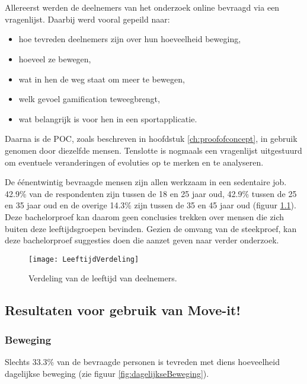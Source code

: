 \chapter{}%
\label{ch:analyse}

Allereerst werden de deelnemers van het onderzoek online bevraagd via een vragenlijst. Daarbij werd vooral gepeild naar:
\begin{itemize}
    \item hoe tevreden deelnemers zijn over hun hoeveelheid beweging,
    \item hoeveel ze bewegen,
    \item wat in hen de weg staat om meer te bewegen,
    \item welk gevoel gamification teweegbrengt,
    \item wat belangrijk is voor hen in een sportapplicatie.
\end{itemize}

Daarna is de POC, zoals beschreven in hoofdstuk \ref{ch:proofofconcept}, in gebruik genomen door diezelfde mensen. Tenslotte is nogmaals een vragenlijst uitgestuurd om eventuele veranderingen of evoluties op te merken en te analyseren.

De éénentwintig bevraagde mensen zijn allen werkzaam in een sedentaire job. 42.9\% van de respondenten zijn tussen de 18 en 25 jaar oud, 42.9\% tussen de 25 en 35 jaar oud en de overige 14.3\% zijn tussen de 35 en 45 jaar oud (figuur \ref{fig:leeftijd}). Deze bachelorproef kan daarom geen conclusies trekken over mensen die zich buiten deze leeftijdsgroepen bevinden. Gezien de omvang van de steekproef, kan deze bachelorproef  suggesties doen die aanzet geven naar verder onderzoek.

\begin{figure}
    \caption[Verdeling van de leeftijd van deelnemers]{Verdeling van de leeftijd van deelnemers.}
    \texttt{[image: LeeftijdVerdeling]}
    \label{fig:leeftijd}
\end{figure}

\section{Resultaten voor gebruik van Move-it!}

\subsection{Beweging}
Slechts 33.3\% van de bevraagde personen is tevreden met diens hoeveelheid dagelijkse beweging (zie figuur \ref{fig:dagelijkseBeweging}).

